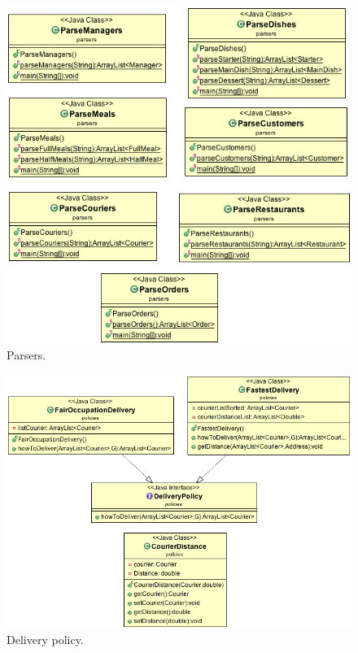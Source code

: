 \begin{figure}
  \begin{center}
    \includegraphics[scale=0.5]{./img/Parsers.png}
    \end{center}
  \caption{\umld Parsers.}
  \label{fig:parsers_uml}
\end{figure}
\begin{figure}
  \begin{center}
    \includegraphics[scale=0.5]{./img/DeliveryPolicy.png}
    \end{center}
  \caption{\umld Delivery policy.}
  \label{fig:delivery_uml}
\end{figure}
